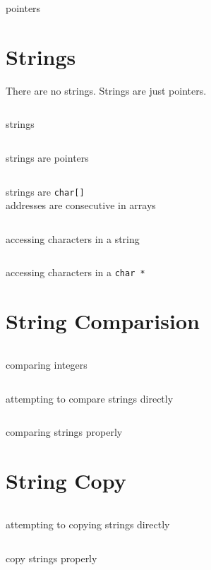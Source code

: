 \begin{code}
	\inputminted[linenos, breaklines]{c}{codes/src4/address4.c}
	\caption{pointers}
\end{code}

\clearpage
\section{Strings}
There are no strings. Strings are just pointers.
\begin{code}
	\inputminted[linenos, breaklines]{c}{codes/src4/address5.c}
	\caption{strings}
\end{code}
\begin{code}
	\inputminted[linenos, breaklines]{c}{codes/src4/address6.c}
	\caption{strings are pointers}
\end{code}
\begin{code}
	\inputminted[linenos, breaklines]{c}{codes/src4/address7.c}
	\caption{strings are \texttt{char[]} \\
		addresses are consecutive in arrays}
\end{code}
\begin{code}
	\inputminted[linenos, breaklines]{c}{codes/src4/address8.c}
	\caption{accessing characters in a string}
\end{code}
\begin{code}
	\inputminted[linenos, breaklines]{c}{codes/src4/address10.c}
	\caption{accessing characters in a \texttt{char *}}
\end{code}

\section{String Comparision}
\begin{code}
	\inputminted[linenos, breaklines]{c}{codes/src4/compare0.c}
	\caption{comparing integers}
\end{code}
\begin{code}
	\inputminted[linenos, breaklines]{c}{codes/src4/compare1.c}
	\caption{attempting to compare strings directly}
\end{code}
\begin{code}
	\inputminted[linenos, breaklines]{c}{codes/src4/compare4.c}
	\caption{comparing strings properly}
\end{code}

\clearpage
\section{String Copy}
\begin{code}
	\inputminted[linenos, breaklines]{c}{codes/src4/copy0.c}
	\caption{attempting to copying strings directly}
\end{code}
\begin{code}
	\inputminted[linenos, breaklines]{c}{codes/src4/copy1.c}
	\caption{copy strings properly}
\end{code}


